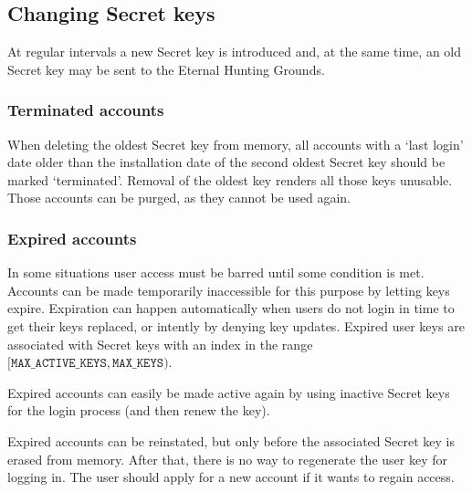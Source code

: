 \subsection{Changing Secret keys}
At regular intervals a new Secret key is introduced and,
at the same time,
an old Secret key may be sent to the Eternal Hunting Grounds.

\subsubsection{Terminated accounts}
When deleting the oldest Secret key from memory,
all accounts with a `last login' date older than the installation
date of the second oldest Secret key should be marked `terminated'.
Removal of the oldest key renders all those keys unusable.
Those accounts can be purged, as they cannot be used again.

\subsubsection{Expired accounts}
In some situations user access must be barred until some condition is met.
Accounts can be made temporarily inaccessible for this purpose by letting keys expire.
Expiration can happen automatically when users do not login in time to get their keys replaced,
or intently by denying key updates.
Expired user keys are associated with Secret keys with an index in the range $[\texttt{MAX\_ACTIVE\_KEYS},\texttt{MAX\_KEYS})$.
\par
Expired accounts can easily be made active again by using inactive Secret keys for the login process (and then renew the key).
\par
Expired accounts can be reinstated,
but only before the associated Secret key is erased from memory.
After that, there is no way to regenerate the user key for logging in.
The user should apply for a new account if it wants to regain access.
